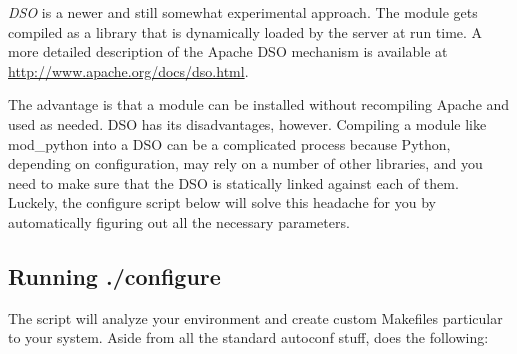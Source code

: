 \emph{DSO} is a newer and still somewhat experimental
approach. The module gets compiled as a library that is dynamically
loaded by the server at run time. A more detailed description of the
Apache DSO mechanism is available at
\url{http://www.apache.org/docs/dso.html}.

The advantage is that a module can be installed without recompiling
Apache and used as needed. DSO has its disadvantages,
however. Compiling a module like mod_python into a DSO can be a
complicated process because Python, depending on configuration, may
rely on a number of other libraries, and you need to make sure that
the DSO is statically linked against each of them. Luckely, the
configure script below will solve this headache for you by
automatically figuring out all the necessary parameters.

\subsection{Running ./configure\label{inst-configure}}

The  script will analyze your environment and create custom
Makefiles particular to your system. Aside from all the standard
autoconf stuff,  does the following:

